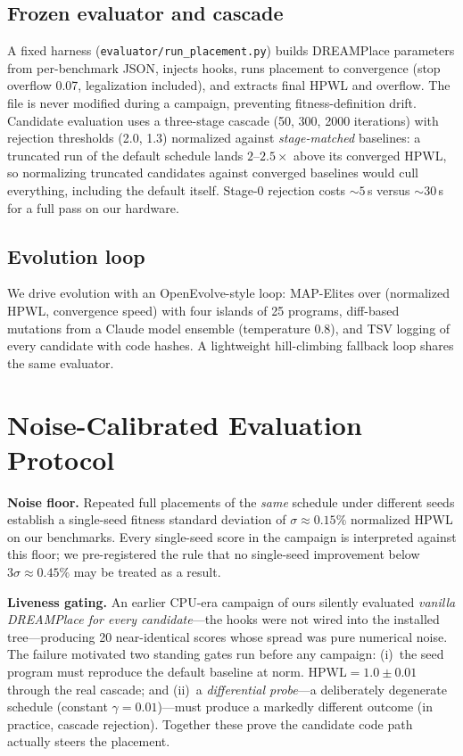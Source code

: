 \documentclass[conference]{IEEEtran}
\begin{document}
\subsection{Frozen evaluator and cascade}
A fixed harness (\texttt{evaluator/run\_placement.py}) builds DREAMPlace
parameters from per-benchmark JSON, injects hooks, runs placement to
convergence (stop overflow 0.07, legalization included), and extracts
final HPWL and overflow. The file is never modified during a campaign,
preventing fitness-definition drift. Candidate evaluation uses a
three-stage cascade (50, 300, 2000 iterations) with rejection thresholds
(2.0, 1.3) normalized against \emph{stage-matched} baselines: a truncated
run of the default schedule lands $2$--$2.5\times$ above its converged
HPWL, so normalizing truncated candidates against converged baselines
would cull everything, including the default itself. Stage-0 rejection
costs ${\sim}5$\,s versus ${\sim}30$\,s for a full pass on our hardware.

\subsection{Evolution loop}
We drive evolution with an OpenEvolve-style loop: MAP-Elites over
(normalized HPWL, convergence speed) with four islands of 25 programs,
diff-based mutations from a Claude model ensemble (temperature 0.8), and
TSV logging of every candidate with code hashes. A lightweight
hill-climbing fallback loop shares the same evaluator.

\section{Noise-Calibrated Evaluation Protocol}
\label{sec:protocol}

\textbf{Noise floor.} Repeated full placements of the \emph{same} schedule
under different seeds establish a single-seed fitness standard deviation
of $\sigma\approx0.15\%$ normalized HPWL on our benchmarks. Every
single-seed score in the campaign is interpreted against this floor; we
pre-registered the rule that no single-seed improvement below
$3\sigma\approx0.45\%$ may be treated as a result.

\textbf{Liveness gating.} An earlier CPU-era campaign of ours silently
evaluated \emph{vanilla DREAMPlace for every candidate}---the hooks were
not wired into the installed tree---producing 20 near-identical scores
whose spread was pure numerical noise. The failure motivated two standing
gates run before any campaign: (i)~the seed program must reproduce the
default baseline at $\text{norm.\ HPWL}=1.0\pm0.01$ through the real
cascade; and (ii)~a \emph{differential probe}---a deliberately degenerate
schedule (constant $\gamma=0.01$)---must produce a markedly different
outcome (in practice, cascade rejection). Together these prove the
candidate code path actually steers the placement.
\end{document}
